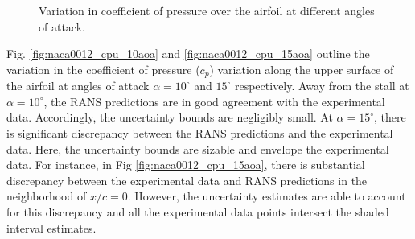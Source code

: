 \begin{figure}
\center
{}
\caption{Variation in coefficient of pressure over the airfoil at different angles of attack.}
\end{figure}

Fig. \ref{fig:naca0012_cpu_10aoa} and \ref{fig:naca0012_cpu_15aoa} outline the variation in the coefficient of pressure ($c_p$) variation along the upper surface of the airfoil at angles of attack $\alpha=10^{\circ}$ and $15^{\circ}$ respectively. Away from the stall at $\alpha=10^{\circ}$, the RANS predictions are in good agreement with the experimental data. Accordingly, the uncertainty bounds are negligibly small. At $\alpha=15^{\circ}$, there is significant discrepancy between the RANS predictions and the experimental data. Here, the uncertainty bounds are sizable and envelope the experimental data. For instance, in Fig \ref{fig:naca0012_cpu_15aoa}, there is substantial discrepancy between the experimental data and RANS predictions in the neighborhood of $x/c=0$. However, the uncertainty estimates are able to account for this discrepancy and all the experimental data points intersect the shaded interval estimates.

